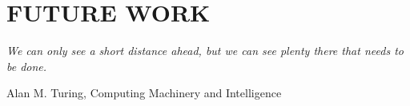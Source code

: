 
\section[FUTURE WORK]{FUTURE WORK} \normalfont

\setlength{\epigraphwidth}{3in} 
\epigraph{\textit{We can only see a short distance ahead, but we can see plenty there
that needs to be done.}}{Alan M. Turing, Computing Machinery and Intelligence}




\setlength{\parindent}{0.0em}



